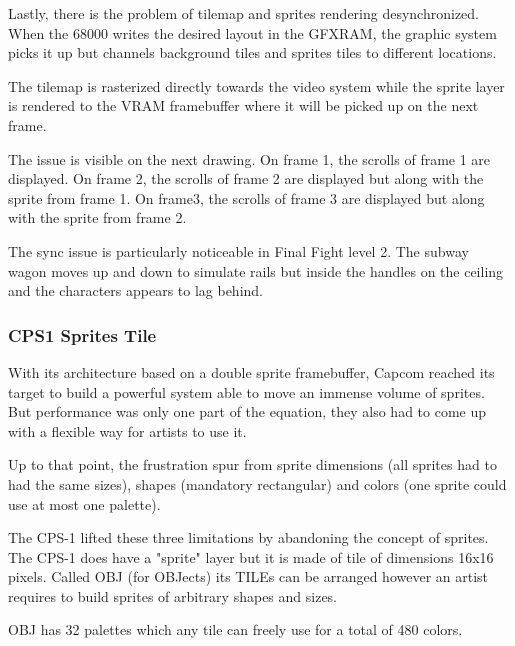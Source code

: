 Lastly, there is the problem of tilemap and sprites rendering desynchronized. When the 68000 writes the desired layout in the GFXRAM, the graphic system picks it up but channels background tiles and sprites tiles to different locations.

The tilemap is rasterized directly towards the video system while the sprite layer is rendered to the VRAM framebuffer where it will be picked up on the next frame.
 


The issue is visible on the next drawing. On frame 1, the scrolls of frame 1 are displayed. On frame 2, the scrolls of frame 2 are displayed but along with the sprite from frame 1. On frame3, the scrolls of frame 3 are displayed but along with the sprite from frame 2. 


\begin{trivia}
The sync issue is particularly noticeable in Final Fight level 2. The subway wagon moves up and down to simulate rails but inside the handles on the ceiling and the characters appears to lag behind.
\end{trivia}

\subsubsection{CPS1 Sprites Tile}
With its architecture based on a double sprite framebuffer, Capcom reached its target to build a powerful system able to move an immense volume of sprites. But performance was only one part of the equation, they also had to come up with a flexible way for artists to use it.

Up to that point, the frustration spur from sprite dimensions (all sprites had to had the same sizes), shapes (mandatory rectangular) and colors (one sprite could use at most one palette). 

The CPS-1 lifted these three limitations by abandoning the concept of sprites. The CPS-1 does have a "sprite" layer but it is made of tile of dimensions 16x16 pixels. Called OBJ (for OBJects) its TILEs can be arranged however an artist requires to build sprites of arbitrary shapes and sizes. 

OBJ has 32 palettes which any tile can freely use for a total of 480 colors.




